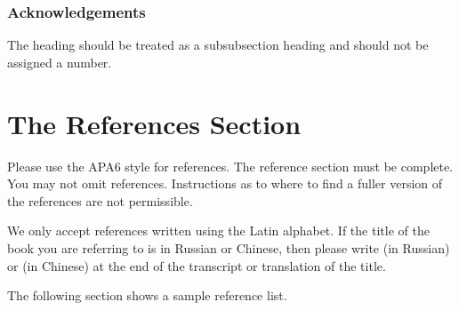\documentclass[runningheads,a4paper]{llncs}
\begin{document}
\subsubsection*{Acknowledgements} The heading should be treated as a
subsubsection heading and should not be assigned a number.

\section{The References Section}\label{references}

Please use the APA6 style for references.
The reference section must be complete. You may not omit references.
Instructions as to where to find a fuller version of the references are
not permissible.

We only accept references written using the Latin alphabet. If the title
of the book you are referring to is in Russian or Chinese, then please write
(in Russian) or (in Chinese) at the end of the transcript or translation
of the title.

The following section shows a sample reference list.



\end{document}
